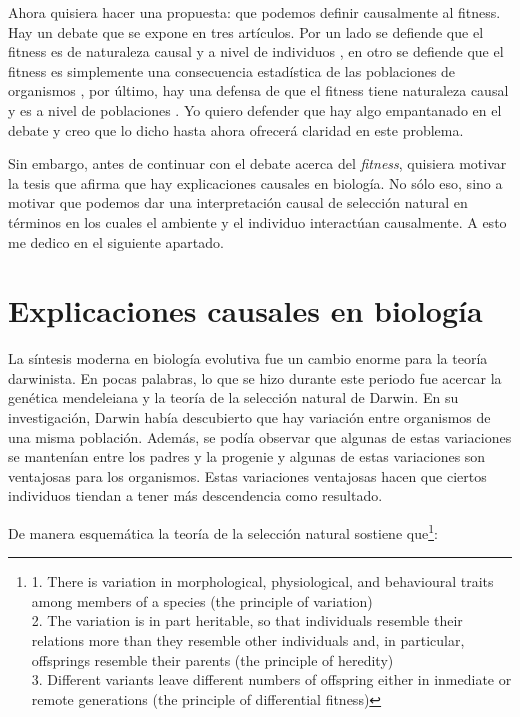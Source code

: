 Ahora quisiera hacer una propuesta: que podemos definir causalmente al fitness. Hay un debate que se expone en tres artículos. Por un lado se defiende que el fitness es de naturaleza causal y a nivel de individuos \cite{Bouchard2004}, en otro se defiende que el fitness es simplemente una consecuencia estadística de las poblaciones de organismos \cite{Walsh2002}, por último, hay una defensa de que el fitness tiene naturaleza causal y es a nivel de poblaciones \cite{Millstein2006}. Yo quiero defender que hay algo empantanado en el debate y creo que lo dicho hasta ahora ofrecerá claridad en este problema.

Sin embargo, antes de continuar con el debate acerca del \emph{fitness}, quisiera motivar la tesis que afirma que hay explicaciones causales en biología. No sólo eso, sino a motivar que podemos dar una interpretación causal de selección natural en términos en los cuales el ambiente y el individuo interactúan causalmente. A esto me dedico en el siguiente apartado.


\section{Explicaciones causales en biología}

\noindent La síntesis moderna en biología evolutiva fue un cambio enorme para la teoría darwinista. En pocas palabras, lo que se hizo durante este periodo fue acercar la genética mendeleiana y la teoría de la selección natural de Darwin. En su investigación, Darwin había descubierto que hay variación entre organismos de una misma población. Además, se podía observar que algunas de estas variaciones se mantenían entre los padres y la progenie y algunas de estas variaciones son ventajosas para los organismos. Estas variaciones ventajosas hacen que ciertos individuos tiendan a tener más descendencia como resultado.

De manera esquemática la teoría de la selección natural sostiene que\footnote{1. There is variation in morphological, physiological, and behavioural traits among members of a species (the principle of variation) \\
2. The variation is in part heritable, so that individuals resemble their relations more than they resemble other individuals and, in particular, offsprings resemble their parents (the principle of heredity) \\
3. Different variants leave different numbers of offspring either in inmediate or remote generations (the principle of differential fitness)}:

